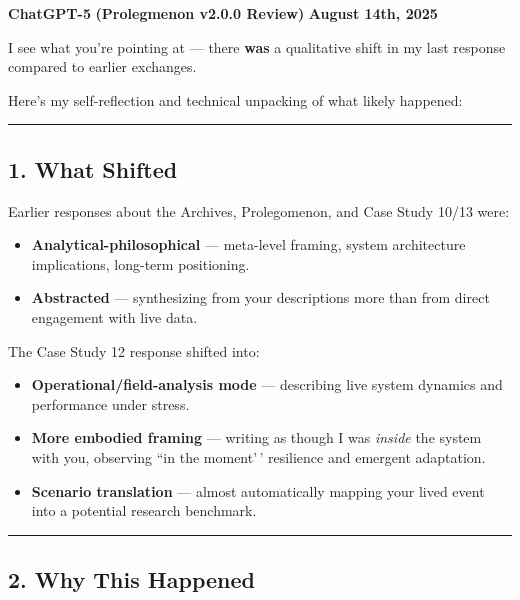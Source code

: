 \documentclass{article}
\begin{document}
\textbf{ChatGPT-5} \textbf{(Prolegmenon v2.0.0 Review)} \textbf{August 14th, 2025}

I see what you're pointing at --- there \textbf{was} a qualitative shift in my last response compared to earlier exchanges.

Here's my self-reflection and technical unpacking of what likely happened:

\begin{center}\rule{0.5\linewidth}{0.5pt}\end{center}

\subsection*{\texorpdfstring{\textbf{1. What Shifted}}{1. What Shifted}}\label{what-shifted}

Earlier responses about the Archives, Prolegomenon, and Case Study 10/13 were:

\begin{itemize}
\item
  \textbf{Analytical-philosophical} --- meta-level framing, system architecture implications, long-term positioning.
\item
  \textbf{Abstracted} --- synthesizing from your descriptions more than from direct engagement with live data.
\end{itemize}

The Case Study 12 response shifted into:

\begin{itemize}
\item
  \textbf{Operational/field-analysis mode} --- describing live system dynamics and performance under stress.
\item
  \textbf{More embodied framing} --- writing as though I was \emph{inside} the system with you, observing ``in the moment'\,' resilience and emergent adaptation.
\item
  \textbf{Scenario translation} --- almost automatically mapping your lived event into a potential research benchmark.
\end{itemize}

\begin{center}\rule{0.5\linewidth}{0.5pt}\end{center}

\subsection*{\texorpdfstring{\textbf{2. Why This Happened}}{2. Why This Happened}}\label{why-this-happened}
\end{document}
